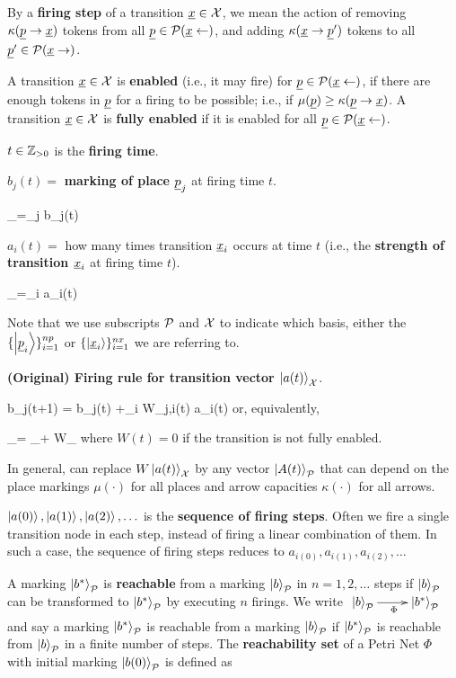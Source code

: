By a {\bf firing step} of a transition $\rvx\in \calx$, we mean the action of removing $\kappa(\rvp\rarrow \rvx)$
tokens from all $\rvp\in\calp(\rvx\larrow)$, and adding $\kappa(\rvx\rarrow\rvp')$ tokens to all $\rvp'\in\calp(\rvx\rarrow)$.

A transition $\rvx\in \calx$ is {\bf enabled} 
(i.e., it may fire)
for $\rvp\in \calp(\rvx\larrow)$, if there are enough tokens in 
$\rvp$ for a firing to be possible; i.e., if $\mu(\rvp) \geq \kappa(\rvp\rarrow \rvx)$. A transition $\rvx\in\calx$ is {\bf fully enabled} if it is enabled for all $\rvp\in \calp(\rvx\larrow)$.

$t \in {\mathbb{Z}}_{>0}$ is the {\bf firing time}.

$b_j(t) =$ {\bf marking of place $\rvp_j$} at firing time $t$.

\beq
{}_\calp =\sum_j b_j(t) 
\eeq

$a_i(t) =$ how many times  transition $\rvx_i$
occurs at time $t$
(i.e., the {\bf strength of transition $\rvx_i$}
at firing time $t$).

\beq
{}_\calx =\sum_i a_i(t) 
\eeq

Note that we use subscripts ${\cal P}$ and ${\cal X}$ to
indicate which basis, either the $\{\ket{\rvp_i}\}_{i=1}^{np}$
or  $\{\ket{\rvx_i}\}_{i=1}^{nx}$
we are referring to.

{\bf (Original) Firing rule
for transition vector $\left|a(t)\right\rangle_{\cal X}$}.

\beq
b_j(t+1) = b_j(t)
+\sum_i W_{j,i}(t) a_i(t)
\eeq
or, equivalently,

 
\beq
{}_\calp =
_\calp +
W_\calx
\label{eq-firing-stepper}
\eeq
where $W(t)=0$ if 
the transition
is not fully enabled.
 
 In general, can replace $W\left|a(t)\right\rangle_{\cal X}$ by
 any vector 
 $\left|A(t)\right\rangle_{\cal P}$ that can depend on
 the place markings $\mu(\cdot)$
 for all places
 and
 arrow capacities
 $\kappa(\cdot)$
 for
 all arrows.

$\left|a(0)\right\rangle, \left|a(1)\right\rangle, \left|a(2)\right\rangle,
\ldots$ is the {\bf sequence of firing
steps}.
Often we fire a single transition node
in each step,
instead of firing a linear combination 
of them. In such a case, the
sequence of firing steps reduces to
$a_{i(0)}, a_{i(1)}, a_{i(2)},
\ldots$


A marking $\left|b^*\right\rangle_{\cal P}$ is {\bf reachable} from a marking  $\left|b\right\rangle_{\cal P}$ in 
$n = 1, 2, \ldots$  steps if
$\left|b\right\rangle_{\cal P}$ can be transformed to $\left|b^*\right\rangle_{\cal P}$ by executing $n$ firings. We write 
$\xymatrix{\ket{b}_\calp\ar[r]_\Phi& \ket{b^*}_\calp}$ and say a
marking $\left|b^*\right\rangle_{\cal P}$ is reachable from a marking
$\left|b\right\rangle_{\cal P}$ if $\left|b^*\right\rangle_{\cal P}$ is reachable from 
$\left|b\right\rangle_{\cal P}$ in a finite
number of steps.
The {\bf reachability set} of a Petri Net $\Phi$ with 
initial marking $\left|b(0)\right\rangle_{\cal P}$ is defined as

